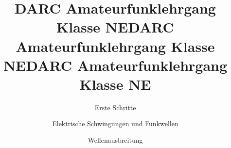 \documentclass[aspectratio = 169]{beamer}
\begin{document}

\title{DARC Amateurfunklehrgang Klasse NE}
\author{Erste Schritte}
\begin{frame}
\maketitle
\end{frame}










\title{DARC Amateurfunklehrgang Klasse NE}
\author{Elektrische Schwingungen und Funkwellen}
\begin{frame}
\maketitle
\end{frame}


















\title{DARC Amateurfunklehrgang Klasse NE}
\author{Wellenausbreitung}
\begin{frame}
\maketitle
\end{frame}

















\end{document}
